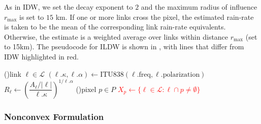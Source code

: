 \documentclass[a4paper,fleqn]{cas-sc}
\begin{document}
As in IDW, we set the decay exponent to $2$ and the maximum radius of influence $r_{\max}$ is set to $15$ \si{\kilo\meter}.
If one or more links cross the pixel, the estimated rain-rate is taken to be the mean of the corresponding link rain-rate equivalents. Otherwise, the estimate is a weighted average over links within distance $r_{\max}$ (set to 15km). The pseudocode for ILDW is shown in , with lines that differ from IDW highlighted in red.

\begin{algorithm}[H]
  \caption{Discretized ILDW. Rainfall is averaged by inverse squared distance to a link. Lines that are different from their corresponding lines in IDW are colored red. }
  \label{alg:ildw}
  \DontPrintSemicolon
  \ForEach(){link $\ell \in \mathcal{L}$}{%
    $(\ell.\kappa,\ell.\alpha) \gets \mathrm{ITU838}(\ell.\mathrm{freq},\ell.\mathrm{polarization})$\;
    $R_\ell\gets \left(\dfrac{A_\ell/|\ell|}{\ell.\kappa}\right)^{1/\ell.\alpha}$\;
  }
  \ForEach(){pixel $p \in {P}$}{
    \textcolor{red}{$X_p \gets \{\ell \in \mathcal{L} : \ell\cap p \neq \emptyset\}$}\;
  }
\end{algorithm}

\newpage
\subsubsection{Nonconvex Formulation}
\end{document}
